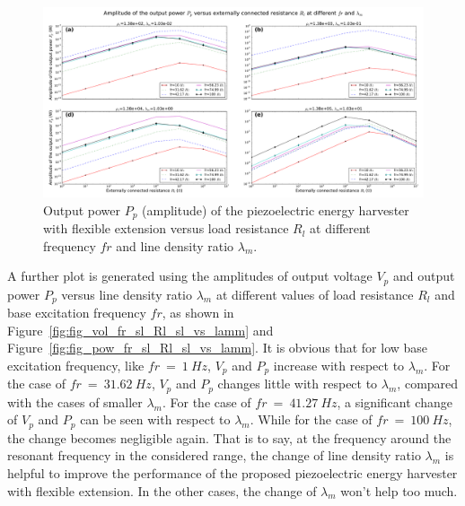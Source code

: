 \documentclass{elsarticle}
\begin{document}
\begin{figure}[!htbp]
    \centering
    \includegraphics[width=\textwidth]{./fig_pow_lamm_list_vs_fr_Rl}
    \caption{Output power $P_p$ (amplitude) of the piezoelectric energy harvester with flexible extension versus load resistance $R_l$ at different frequency $fr$ and line density ratio $\lambda_m$. }
    \label{fig:fig_pow_lamm_list_vs_fr_Rl}
\end{figure}

A further plot is generated using the amplitudes of output voltage $V_p$ and output power $P_p$ versus line density ratio $\lambda_m$ at different values of load resistance $R_l$ and base excitation frequency $fr$, as shown in Figure~\ref{fig:fig_vol_fr_sl_Rl_sl_vs_lamm} and Figure~\ref{fig:fig_pow_fr_sl_Rl_sl_vs_lamm}. It is obvious that for low base excitation frequency, like $fr\ =\ 1\ Hz$, $V_p$ and $P_p$ increase with respect to $\lambda_m$. For the case of $fr\ =\ 31.62 \ Hz$, $V_p$ and $P_p$ changes little with respect to $\lambda_m$, compared with the cases of smaller $\lambda_m$. For the case of $fr\ =\ 41.27 \ Hz$, a significant change of $V_p$ and $P_p$ can be seen with respect to $\lambda_m$. While for the case of $fr\ =\ 100 \ Hz$, the change becomes negligible again. That is to say, at the frequency around the resonant frequency in the considered range, the change of line density ratio $\lambda_m$ is helpful to improve the performance of the proposed piezoelectric energy harvester with flexible extension. In the other cases, the change of $\lambda_m$ won't help too much. 
\end{document}

